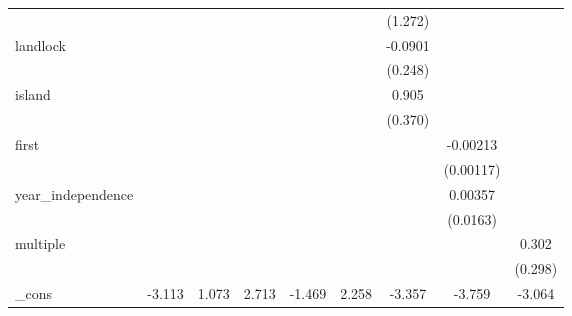 {\begin{tabular}{l*{8}{c}}
            &                     &                     &                     &                     &                     &     (1.272)         &                     &                     \\
[1em]
landlock    &                     &                     &                     &                     &                     &     -0.0901         &                     &                     \\
            &                     &                     &                     &                     &                     &     (0.248)         &                     &                     \\
[1em]
island      &                     &                     &                     &                     &                     &       0.905\sym{**} &                     &                     \\
            &                     &                     &                     &                     &                     &     (0.370)         &                     &                     \\
[1em]
first       &                     &                     &                     &                     &                     &                     &    -0.00213\sym{*}  &                     \\
            &                     &                     &                     &                     &                     &                     &   (0.00117)         &                     \\
[1em]
year\_independence&                     &                     &                     &                     &                     &                     &     0.00357         &                     \\
            &                     &                     &                     &                     &                     &                     &    (0.0163)         &                     \\
[1em]
multiple    &                     &                     &                     &                     &                     &                     &                     &       0.302         \\
            &                     &                     &                     &                     &                     &                     &                     &     (0.298)         \\
[1em]
\_cons      &      -3.113         &       1.073         &       2.713         &      -1.469         &       2.258         &      -3.357         &      -3.759         &      -3.064         \\

\end{tabular}}
